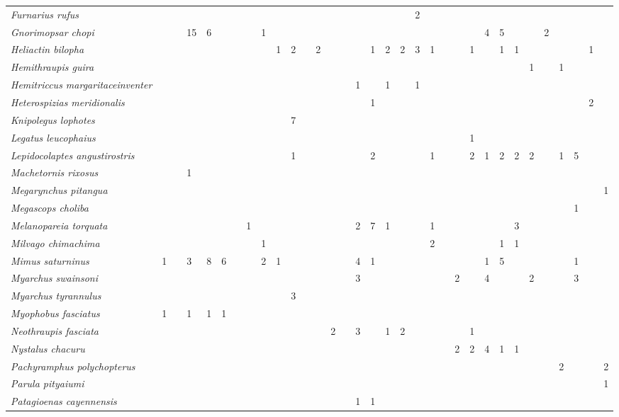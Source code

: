\begin{longtable}[c]{@{}lllllllllllllllllllllllllllllllll@{}}
\emph{Furnarius rufus} & & & & & & & & & & & & & & & & & & & 2 & & & & &
& & & & & & & &\tabularnewline
\emph{Gnorimopsar chopi} & & & 15 & 6 & & & & 1 & & & & & & & & & & & &
& & & & 4 & 5 & & & 2 & & & &\tabularnewline
\emph{Heliactin bilopha} & & & & & & & & & 1 & 2 & & 2 & & & & 1 & 2 & 2
& 3 & 1 & & & 1 & & 1 & 1 & & & & & 1 &\tabularnewline
\emph{Hemithraupis guira} & & & & & & & & & & & & & & & & & & & & & & &
& & & & 1 & & 1 & & &\tabularnewline
\emph{Hemitriccus margaritaceinventer} & & & & & & & & & & & & & & & 1 &
& 1 & & 1 & & & & & & & & & & & & &\tabularnewline
\emph{Heterospizias meridionalis} & & & & & & & & & & & & & & & & 1 & &
& & & & & & & & & & & & & 2 &\tabularnewline
\emph{Knipolegus lophotes} & & & & & & & & & & 7 & & & & & & & & & & & &
& & & & & & & & & &\tabularnewline
\emph{Legatus leucophaius} & & & & & & & & & & & & & & & & & & & & & & &
1 & & & & & & & & &\tabularnewline
\emph{Lepidocolaptes angustirostris} & & & & & & & & & & 1 & & & & & & 2
& & & & 1 & & & 2 & 1 & 2 & 2 & 2 & & 1 & 5 & &\tabularnewline
\emph{Machetornis rixosus} & & & 1 & & & & & & & & & & & & & & & & & & &
& & & & & & & & & &\tabularnewline
\emph{Megarynchus pitangua} & & & & & & & & & & & & & & & & & & & & & &
& & & & & & & & & & 1\tabularnewline
\emph{Megascops choliba} & & & & & & & & & & & & & & & & & & & & & & & &
& & & & & & 1 & &\tabularnewline
\emph{Melanopareia torquata} & & & & & & & 1 & & & & & & & & 2 & 7 & 1 &
& & 1 & & & & & & 3 & & & & & &\tabularnewline
\emph{Milvago chimachima} & & & & & & & & 1 & & & & & & & & & & & & 2 &
& & & & 1 & 1 & & & & & &\tabularnewline
\emph{Mimus saturninus} & 1 & & 3 & 8 & 6 & & & 2 & 1 & & & & & & 4 & 1
& & & & & & & & 1 & 5 & & & & & 1 & &\tabularnewline
\emph{Myarchus swainsoni} & & & & & & & & & & & & & & & 3 & & & & & & &
2 & & 4 & & & 2 & & & 3 & &\tabularnewline
\emph{Myarchus tyrannulus} & & & & & & & & & & 3 & & & & & & & & & & & &
& & & & & & & & & &\tabularnewline
\emph{Myophobus fasciatus} & 1 & & 1 & 1 & 1 & & & & & & & & & & & & & &
& & & & & & & & & & & & &\tabularnewline
\emph{Neothraupis fasciata} & & & & & & & & & & & & & 2 & & 3 & & 1 & 2
& & & & & 1 & & & & & & & & &\tabularnewline
\emph{Nystalus chacuru} & & & & & & & & & & & & & & & & & & & & & & 2 &
2 & 4 & 1 & 1 & & & & & &\tabularnewline
\emph{Pachyramphus polychopterus} & & & & & & & & & & & & & & & & & & &
& & & & & & & & & & 2 & & & 2\tabularnewline
\emph{Parula pityaiumi} & & & & & & & & & & & & & & & & & & & & & & & &
& & & & & & & & 1\tabularnewline
\emph{Patagioenas cayennensis} & & & & & & & & & & & & & & & 1 & 1 & & &
& & & & & & & & & & & & &\tabularnewline

\end{longtable}
